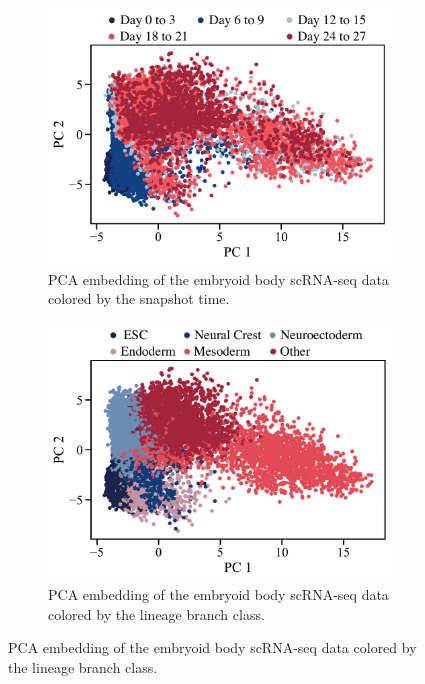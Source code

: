 \begin{figure}[t]
     \centering
     \begin{subfigure}[t]{0.45\textwidth}
         \centering
         \includegraphics[width=\textwidth]{figures/fig_data_moon_days_full.pdf}
         \caption{PCA embedding of the embryoid body scRNA-seq data colored by the snapshot time.}
     \end{subfigure}
     \hfill
     \begin{subfigure}[t]{0.45\textwidth}
         \centering
         \includegraphics[width=\textwidth]{figures/fig_data_moon_Branches_full.pdf}
         \caption{PCA embedding of the embryoid body scRNA-seq data colored by the lineage branch class.}
     \end{subfigure}


\end{figure}
